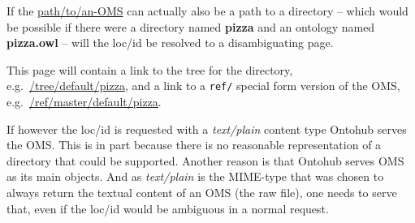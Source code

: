 \documentclass[10pt, a4paper]{isov2}
\begin{document}


If the \url{path/to/an-OMS} can actually also be a path to a directory --
which would be possible if there were a directory named \textbf{pizza} and an
ontology named \textbf{pizza.owl} -- will the loc/id be resolved to a
disambiguating page.

This page will contain a link to the tree for the directory, e.g.\ 
\url{/tree/default/pizza}, and a link to a \texttt{ref/} special form
version of the OMS, e.g.\ \url{/ref/master/default/pizza}.

If however the loc/id is requested with a \emph{text/plain} content type Ontohub
serves the OMS. This is in part because there is no reasonable
representation of a directory that  could be supported. Another reason is
that Ontohub serves OMS as its main objects. And as \emph{text/plain} is
the MIME-type that was chosen to always return the textual content of an
OMS (the raw file), one needs  to serve that, even if the loc/id would
be ambiguous in a normal request.


\cleardoublepage
{}\label{a:categories}


\end{document}
